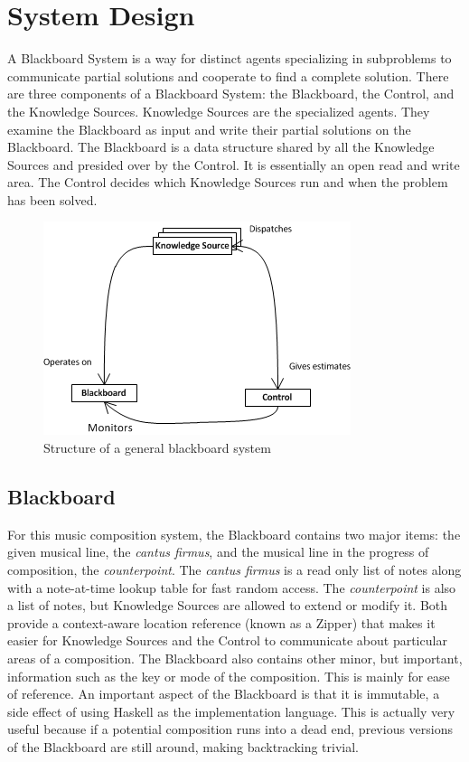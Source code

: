 \section{System Design} %

A Blackboard System is a way for distinct agents specializing in subproblems to communicate partial solutions and cooperate to find a complete solution.
There are three components of a Blackboard System: the Blackboard, the Control, and the Knowledge Sources.
Knowledge Sources are the specialized agents. They examine the Blackboard as input and write their partial solutions on the Blackboard.
The Blackboard is a data structure shared by all the Knowledge Sources and presided over by the Control. It is essentially an open read and write area.
The Control decides which Knowledge Sources run and when the problem has been solved.

\begin{figure}[h]
\caption{Structure of a general blackboard system}
\centering
	\includegraphics[keepaspectratio=true]{blackboard-system-diagram.png}
\end{figure}

\subsection{Blackboard} %

For this music composition system, the Blackboard contains two major items: the given musical line, the \emph{cantus firmus}, and the musical line in the progress of composition, the \emph{counterpoint}.
The \emph{cantus firmus} is a read only list of notes along with a note-at-time lookup table for fast random access.
The \emph{counterpoint} is also a list of notes, but Knowledge Sources are allowed to extend or modify it.
Both provide a context-aware location reference (known as a Zipper) that makes it easier for Knowledge Sources and the Control to communicate about particular areas of a composition.
The Blackboard also contains other minor, but important, information such as the key or mode of the composition. This is mainly for ease of reference.
An important aspect of the Blackboard is that it is immutable, a side effect of using Haskell as the implementation language.
This is actually very useful because if a potential composition runs into a dead end, previous versions of the Blackboard are still around, making backtracking trivial.

